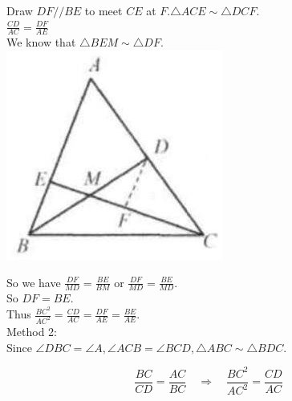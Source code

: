 \documentclass[10pt]{article}
\begin{document}
Draw \(D F / / B E\) to meet \(C E\) at \(F . \triangle A C E \sim \triangle D C F\).\\
\(\frac{C D}{A C}=\frac{D F}{A E}\)\\
We know that \(\triangle B E M \sim \triangle D F\).\\
\includegraphics[max width=\textwidth, center]{2025_04_17_97bc1f7e44d93c271a88g-115(1)}

So we have \(\frac{D F}{M D}=\frac{B E}{B M}\) or \(\frac{D F}{M D}=\frac{B E}{M D}\).\\
So \(D F=B E\).\\
Thus \(\frac{B C^{2}}{A C^{2}}=\frac{C D}{A C}=\frac{D F}{A E}=\frac{B E}{A E}\).\\
Method 2:\\
Since \(\angle D B C=\angle A, \angle A C B=\angle B C D, \triangle A B C \sim \triangle B D C\).

\[
\frac{B C}{C D}=\frac{A C}{B C} \quad \Rightarrow \quad \frac{B C^{2}}{A C^{2}}=\frac{C D}{A C}
\]
\end{document}
